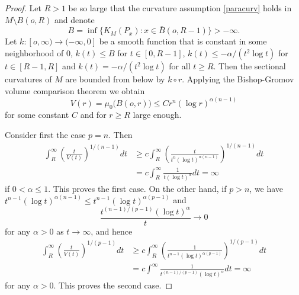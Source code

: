 \documentclass[10pt,a4paper,reqno]{amsart}
\numberwithin{equation}{section}
\theoremstyle{plain}
\theoremstyle{definition}
\begin{document}
\begin{proof}
 Let $R>1$ be so large that the curvature assumption \eqref{paracurv} holds in $M\setminus B(o,R)$
 and denote
  \[
    B = \inf \big\{K_M(P_x) \colon x \in \bar B(o,R-1)\big\} > -\infty.
  \]
Let $k\colon[o,\infty) \to (-\infty,0]$ be a smooth function that is constant in some neighborhood of $0$,
$k(t)\le B$ for $t\in [0,R-1]$, $k(t) \le -\alpha/(t^2\log t)$ for $t\in [R-1,R]$ and $k(t)= -\alpha/(t^2\log t)$
for all $t\ge R$. Then the sectional curvatures of $M$ are bounded from below by $k\circ r$.
Applying the Bishop-Gromov volume comparison theorem 
we obtain
  \[
V(r)= \mu_0 \big(B(o,r)\big) \le C r^n (\log r)^{\alpha(n-1)}
  \]
for some constant $C$ and for $r\ge R$ large enough.
  
Consider first the case $p=n$. Then 
  \begin{align*}
   \int_R^\infty \left( \frac{t}{V(t)} \right)^{1/(n-1)} dt 
   &\ge c\int_R^\infty \left( \frac{t}{t^n (\log t)^{\alpha(n-1)}} \right)^{1/(n-1)} dt \\
   &= c\int_R^\infty  \frac{1}{t (\log t)^{\alpha}}  dt = \infty
  \end{align*}
if $0<\alpha \le 1$. This proves the first case. On the other hand, if $p>n$, we have
$t^{n-1}(\log t)^{\alpha(n-1)} \le t^{n-1}(\log t)^{\alpha(p-1)}$ and
    \[
     \frac{t^{(n-1)/(p-1)}(\log t)^{\alpha}}{t} \longrightarrow 0
    \]
for any $\alpha > 0$ as $t\to\infty$, and hence
    \begin{align*}
     \int_R^\infty \left( \frac{t}{V(t)} \right)^{1/(p-1)} dt &\ge
     c\int_R^\infty \left( \frac{1}{t^{n-1}(\log t)^{\alpha(p-1)}} \right)^{1/(p-1)} dt \\
     &= c\int^\infty \frac{1}{t^{(n-1)/(p-1)}(\log t)^{\alpha}}  dt = \infty
    \end{align*}
for any $\alpha >0$. This proves the second case.  
  \end{proof}
\end{document}
